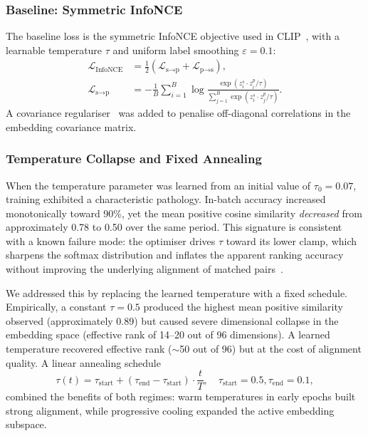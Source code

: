 \documentclass[pdflatex,sn-mathphys-num]{sn-jnl}%
\theoremstyle{thmstyleone}%
\theoremstyle{thmstyletwo}%
\theoremstyle{thmstylethree}%
\begin{document}
\subsubsection{Baseline: Symmetric InfoNCE}

The baseline loss is the symmetric InfoNCE objective used in CLIP~\cite{radford2021clip}, with a learnable temperature $\tau$ and uniform label smoothing $\varepsilon = 0.1$:
\begin{align}
\mathcal{L}_\text{InfoNCE} &= \tfrac{1}{2}\left(\mathcal{L}_\text{s$\rightarrow$p} + \mathcal{L}_\text{p$\rightarrow$s}\right), \\
\mathcal{L}_\text{s$\rightarrow$p} &= -\frac{1}{B}\sum_{i=1}^{B} \log \frac{\exp(z_i^s \cdot z_i^p / \tau)}{\sum_{j=1}^{B} \exp(z_i^s \cdot z_j^p / \tau)}.
\end{align}
A covariance regulariser~\cite{bardes2022vicreg} was added to penalise off-diagonal correlations in the embedding covariance matrix.

\subsubsection{Temperature Collapse and Fixed Annealing}

When the temperature parameter was learned from an initial value of $\tau_0 = 0.07$, training exhibited a characteristic pathology. In-batch accuracy increased monotonically toward 90\%, yet the mean positive cosine similarity \emph{decreased} from approximately 0.78 to 0.50 over the same period. This signature is consistent with a known failure mode: the optimiser drives $\tau$ toward its lower clamp, which sharpens the softmax distribution and inflates the apparent ranking accuracy without improving the underlying alignment of matched pairs~\cite{wang2020understanding}.

We addressed this by replacing the learned temperature with a fixed schedule. Empirically, a constant $\tau = 0.5$ produced the highest mean positive similarity observed (approximately 0.89) but caused severe dimensional collapse in the embedding space (effective rank of 14--20 out of 96 dimensions). A learned temperature recovered effective rank ($\sim$50 out of 96) but at the cost of alignment quality. A linear annealing schedule
\begin{equation}
\tau(t) = \tau_\text{start} + (\tau_\text{end} - \tau_\text{start}) \cdot \frac{t}{T}, \quad \tau_\text{start} = 0.5, \tau_\text{end} = 0.1,
\end{equation}
combined the benefits of both regimes: warm temperatures in early epochs built strong alignment, while progressive cooling expanded the active embedding subspace.
\end{document}
